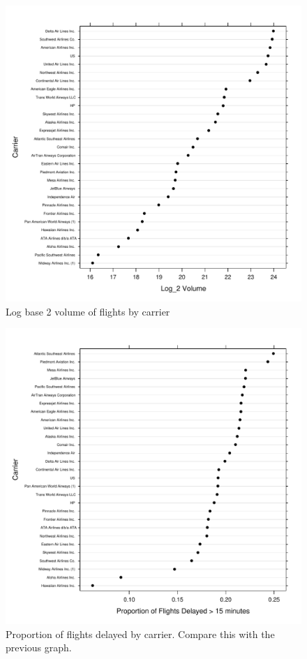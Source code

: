 \documentclass[letterpaper,10pt,english]{sphinxmanual}
\begin{document}
\begin{figure}[htbp]
\centering
\capstart

\includegraphics{carrvol.pdf}
\caption{Log base 2 volume of flights by carrier}\end{figure}
\begin{figure}[htbp]
\centering
\capstart

\includegraphics{carrdelay.pdf}
\caption{Proportion of flights delayed by carrier. Compare this with the previous graph.}\end{figure}
\end{document}
